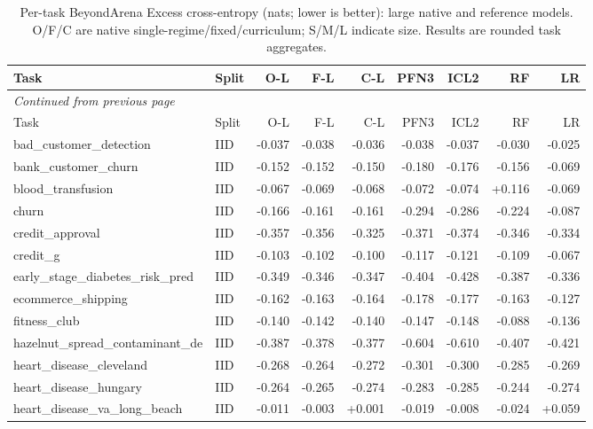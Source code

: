 \begin{longtable}{@{}p{3.95cm}lrrrrrrr@{}}
\caption{Per-task BeyondArena Excess cross-entropy (nats; lower is better): large native and reference models. O/F/C are native single-regime/fixed/curriculum; S/M/L indicate size. Results are rounded task aggregates.}\label{tab:celarge}\\
\toprule Task & Split & O-L & F-L & C-L & PFN3 & ICL2 & RF & LR\\\midrule
\endfirsthead
\multicolumn{9}{l}{\emph{Continued from previous page}}\\\toprule
Task & Split & O-L & F-L & C-L & PFN3 & ICL2 & RF & LR\\\midrule\endhead
\bottomrule\endfoot
bad\_\allowbreak{}customer\_\allowbreak{}detection & IID & -0.037 & -0.038 & -0.036 & -0.038 & -0.037 & -0.030 & -0.025\\
bank\_\allowbreak{}customer\_\allowbreak{}churn & IID & -0.152 & -0.152 & -0.150 & -0.180 & -0.176 & -0.156 & -0.069\\
blood\_\allowbreak{}transfusion & IID & -0.067 & -0.069 & -0.068 & -0.072 & -0.074 & +0.116 & -0.069\\
churn & IID & -0.166 & -0.161 & -0.161 & -0.294 & -0.286 & -0.224 & -0.087\\
credit\_\allowbreak{}approval & IID & -0.357 & -0.356 & -0.325 & -0.371 & -0.374 & -0.346 & -0.334\\
credit\_\allowbreak{}g & IID & -0.103 & -0.102 & -0.100 & -0.117 & -0.121 & -0.109 & -0.067\\
early\_\allowbreak{}stage\_\allowbreak{}diabetes\_\allowbreak{}risk\_\allowbreak{}pred & IID & -0.349 & -0.346 & -0.347 & -0.404 & -0.428 & -0.387 & -0.336\\
ecommerce\_\allowbreak{}shipping & IID & -0.162 & -0.163 & -0.164 & -0.178 & -0.177 & -0.163 & -0.127\\
fitness\_\allowbreak{}club & IID & -0.140 & -0.142 & -0.140 & -0.147 & -0.148 & -0.088 & -0.136\\
hazelnut\_\allowbreak{}spread\_\allowbreak{}contaminant\_\allowbreak{}de & IID & -0.387 & -0.378 & -0.377 & -0.604 & -0.610 & -0.407 & -0.421\\
heart\_\allowbreak{}disease\_\allowbreak{}cleveland & IID & -0.268 & -0.264 & -0.272 & -0.301 & -0.300 & -0.285 & -0.269\\
heart\_\allowbreak{}disease\_\allowbreak{}hungary & IID & -0.264 & -0.265 & -0.274 & -0.283 & -0.285 & -0.244 & -0.274\\
heart\_\allowbreak{}disease\_\allowbreak{}va\_\allowbreak{}long\_\allowbreak{}beach & IID & -0.011 & -0.003 & +0.001 & -0.019 & -0.008 & -0.024 & +0.059\\

\end{longtable}
